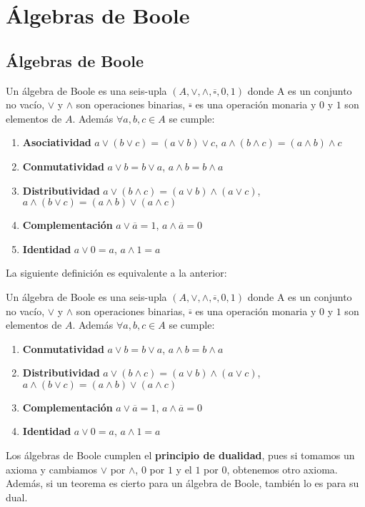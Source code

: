 \newpage
\section{Álgebras de Boole}
\subsection{Álgebras de Boole}
\begin{ndef}
    Un álgebra de Boole es una seis-upla $(A, \lor, \land, \overline{\square}, 0, 1)$ donde A es un conjunto no vacío, $\lor$ y $\land$ son operaciones binarias, $\overline{\square}$ es una operación monaria y
    $0$ y $1$ son elementos de $A$. Además $\forall a,b,c \in A$ se cumple:
    \begin{enumerate}[label=\emph{A\arabic*}]
        \item\label{a0} \textbf{Asociatividad} $a \lor (b \lor c) = (a \lor b) \lor c$, $a \land (b \land c) = (a \land b) \land c$
        \item\label{a1} \textbf{Conmutatividad} $a \lor b = b \lor a$, $a \land b = b \land a$
        \item\label{a2} \textbf{Distributividad} $a \lor (b \land c) = (a \lor b) \land (a \lor c)$, $a \land (b \lor c) = (a \land b) \lor (a \land c)$
        \item\label{a3} \textbf{Complementación} $a \lor \overline{a} = 1$, $a \land \overline{a} = 0$
        \item\label{a4} \textbf{Identidad} $a \lor 0 = a$, $a \land 1 = a$
    \end{enumerate}
\end{ndef}
La siguiente definición es equivalente a la anterior:
\begin{ndef}[Huntington]
    Un álgebra de Boole es una seis-upla $(A, \lor, \land, \overline{\square}, 0, 1)$ donde A es un conjunto no vacío, $\lor$ y $\land$ son operaciones binarias, $\overline{\square}$ es una operación monaria y
    $0$ y $1$ son elementos de $A$. Además $\forall a,b,c \in A$ se cumple:
    \begin{enumerate}[label=\emph{A\arabic*}]
        \item\label{a1} \textbf{Conmutatividad} $a \lor b = b \lor a$, $a \land b = b \land a$
        \item\label{a2} \textbf{Distributividad} $a \lor (b \land c) = (a \lor b) \land (a \lor c)$, $a \land (b \lor c) = (a \land b) \lor (a \land c)$
        \item\label{a3} \textbf{Complementación} $a \lor \overline{a}  = 1$, $a \land \overline{a}  = 0$
        \item\label{a4} \textbf{Identidad} $a \lor 0 = a$, $a \land 1 = a$
    \end{enumerate}
\end{ndef}
\begin{nota}
    Los álgebras de Boole cumplen el \textbf{principio de dualidad}, pues si tomamos un axioma y cambiamos $\lor$ por $\land$, $0$ por $1$ y el $1$ por $0$, obtenemos otro axioma. Además,
    si un teorema es cierto para un álgebra de Boole, también lo es para su dual.
\end{nota}

